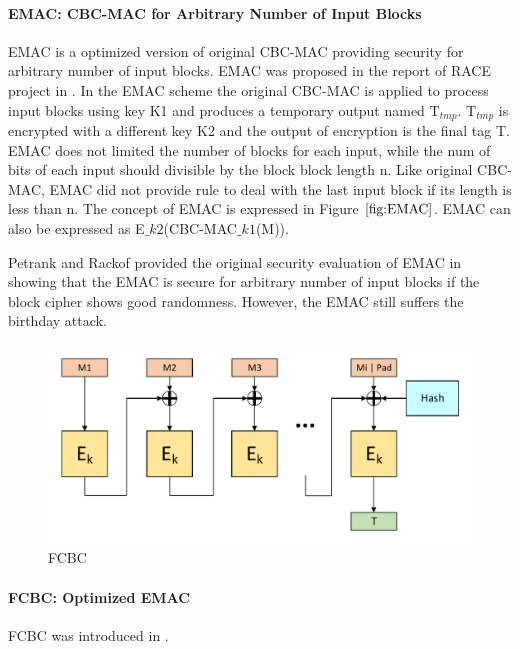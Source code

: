\documentclass{article}
\begin{document}
\paragraph{EMAC: CBC-MAC for Arbitrary Number of Input Blocks}
EMAC is a optimized version of original CBC-MAC providing security for arbitrary number of input blocks. EMAC was proposed in the report of RACE project in \cite{}. In the EMAC scheme the original CBC-MAC is applied to process input blocks using key K1 and produces a temporary output named T$_{tmp}$. T$_{tmp}$ is encrypted with a different key K2 and the output of encryption is the final tag T. EMAC does not limited the number of blocks for each input, while the num of bits of each input should divisible by the block block length n. Like original CBC-MAC, EMAC did not provide rule to deal with the last input block if its length is less than n. The concept of EMAC is expressed in Figure $\ref{fig:EMAC}$. EMAC can also be expressed as E$\_{k2}$(CBC-MAC$\_{k1}$(M)). 

Petrank and Rackof provided the original security evaluation of EMAC in \cite{emac} showing that the EMAC is secure for arbitrary number of input blocks if the block cipher shows good randomness. However, the EMAC still suffers the birthday attack.

\begin{figure}[htbp]
\centering
\includegraphics[scale=0.5]{./diagrams/cmac.pdf}
\caption{FCBC}
\label{fig:FCBC}
\end{figure}
\paragraph{FCBC: Optimized EMAC}
FCBC was introduced in \cite{}.
\end{document}
